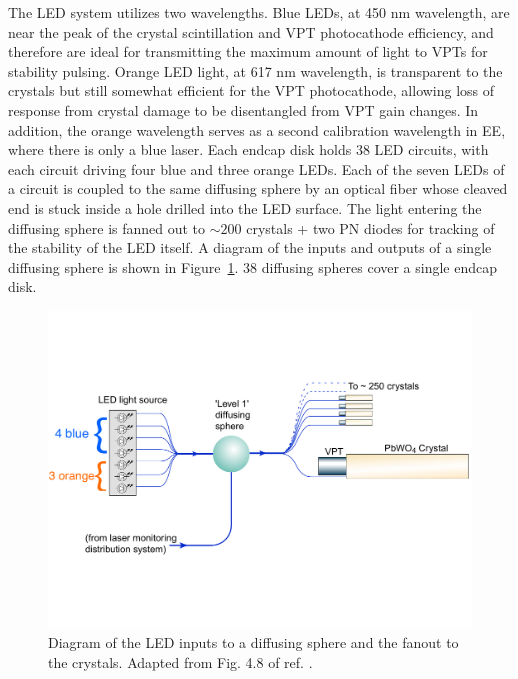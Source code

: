 \documentclass[dissertation.tex]{subfiles}
\begin{document}
The LED system utilizes two wavelengths.  Blue LEDs, at 450 nm wavelength, are near the peak of the crystal scintillation and VPT photocathode efficiency, and therefore are ideal for transmitting the maximum amount of light to VPTs for stability pulsing.  Orange LED light, at 617 nm wavelength, is transparent to the crystals but still somewhat efficient for the VPT photocathode, allowing loss of response from crystal damage to be disentangled from VPT gain changes.  In addition, the orange wavelength serves as a second calibration wavelength in EE, where there is only a blue laser.  Each endcap disk holds 38 LED circuits, with each circuit driving four blue and three orange LEDs.  Each of the seven LEDs of a circuit is coupled to the same diffusing sphere by an optical fiber whose cleaved end is stuck inside a hole drilled into the LED surface.  The light entering the diffusing sphere is fanned out to $\sim200$ crystals + two PN diodes for tracking of the stability of the LED itself.  A diagram of the inputs and outputs of a single diffusing sphere is shown in Figure~\ref{fig:LED_DS_diagram}.  38 diffusing spheres cover a single endcap disk.

\begin{figure}
	\centering
	\includegraphics[scale=0.375]{LED_DS_diagram}
	\caption{Diagram of the LED inputs to a diffusing sphere and the fanout to the crystals.  Adapted from Fig. 4.8 of ref. \cite{1748-0221-3-08-S08004}.}
	\label{fig:LED_DS_diagram}
\end{figure}
\end{document}
